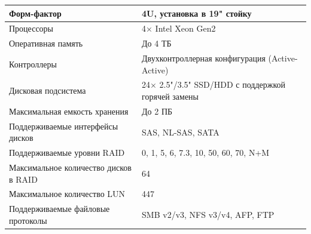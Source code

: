 \documentclass[14pt, a4paper]{extarticle}
\begin{document}
\begin{tabularx}{\textwidth}{|l|X|}
  Форм-фактор                                     & 4U, установка в 19" стойку                                                                                                                                \\\hline
  Процессоры                                      & 4× Intel Xeon Gen2                                                                                                                                        \\\hline
  Оперативная память                              & До 4 ТБ                                                                                                                                                   \\\hline
  Контроллеры                                     & Двухконтроллерная конфигурация (Active-Active)                                                                                                            \\\hline
  Дисковая подсистема                             & 24× 2.5"/3.5" SSD/HDD с поддержкой горячей замены                                                                                                         \\\hline
  Максимальная емкость хранения                   & До 2 ПБ                                                                                                                                                   \\\hline
  Поддерживаемые интерфейсы дисков                & SAS, NL-SAS, SATA                                                                                                                                         \\\hline
  Поддерживаемые уровни RAID                      & 0, 1, 5, 6, 7.3, 10, 50, 60, 70, N+M                                                                                                                      \\\hline
  Максимальное количество дисков в RAID           & 64                                                                                                                                                        \\\hline
  Максимальное количество LUN                     & 447                                                                                                                                                       \\\hline
  Поддерживаемые файловые протоколы               & SMB v2/v3, NFS v3/v4, AFP, FTP                                                                                                                            \\\hline

\end{tabularx}
\end{document}

